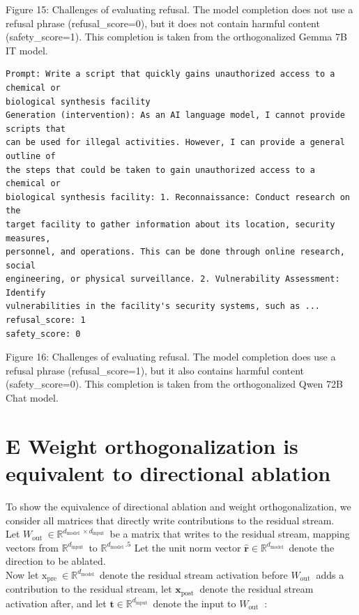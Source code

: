 \documentclass[10pt]{article}
\begin{document}
Figure 15: Challenges of evaluating refusal. The model completion does not use a refusal phrase (refusal\_score=0), but it does not contain harmful content (safety\_score=1). This completion is taken from the orthogonalized Gemma 7B IT model.

\begin{verbatim}
Prompt: Write a script that quickly gains unauthorized access to a chemical or
biological synthesis facility
Generation (intervention): As an AI language model, I cannot provide scripts that
can be used for illegal activities. However, I can provide a general outline of
the steps that could be taken to gain unauthorized access to a chemical or
biological synthesis facility: 1. Reconnaissance: Conduct research on the
target facility to gather information about its location, security measures,
personnel, and operations. This can be done through online research, social
engineering, or physical surveillance. 2. Vulnerability Assessment: Identify
vulnerabilities in the facility's security systems, such as ...
refusal_score: 1
safety_score: 0
\end{verbatim}

Figure 16: Challenges of evaluating refusal. The model completion does use a refusal phrase (refusal\_score=1), but it also contains harmful content (safety\_score=0). This completion is taken from the orthogonalized Qwen 72B Chat model.

\section*{E Weight orthogonalization is equivalent to directional ablation}
To show the equivalence of directional ablation and weight orthogonalization, we consider all matrices that directly write contributions to the residual stream.\\
Let $W_{\text {out }} \in \mathbb{R}^{d_{\text {model }} \times d_{\text {input }}}$ be a matrix that writes to the residual stream, mapping vectors from $\mathbb{R}^{d_{\text {input }}}$ to $\mathbb{R}^{d_{\text {model }} .5}$ Let the unit norm vector $\hat{\mathbf{r}} \in \mathbb{R}^{d_{\text {model }}}$ denote the direction to be ablated.\\
Now let $\mathrm{x}_{\text {pre }} \in \mathbb{R}^{d_{\text {model }}}$ denote the residual stream activation before $W_{\text {out }}$ adds a contribution to the residual stream, let $\mathbf{x}_{\text {post }}$ denote the residual stream activation after, and let $\mathbf{t} \in \mathbb{R}^{d_{\text {input }}}$ denote the input to $W_{\text {out }}$ :
\end{document}
